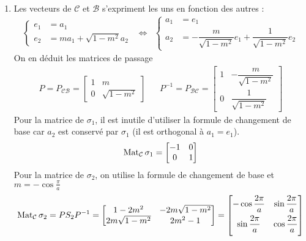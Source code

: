 \begin{enumerate}
\begin{enumerate}
\item Les vecteurs de $\mathcal C$ et $\mathcal B$ s'expriment les uns en fonction des autres :
\begin{align*}
 \left\lbrace 
\begin{aligned}
  e_1 &= a_1\\
 e_2 &= ma_1 +\sqrt{1-m^2}a_2 
\end{aligned}
\right. 
&\Leftrightarrow &
 \left\lbrace 
\begin{aligned}
 a_1 &= e_1 \\
 a_2 &= -\dfrac{m}{\sqrt{1-m^2}}e_1 +\dfrac{1}{\sqrt{1-m^2}}e_2 
\end{aligned}
\right. 
\end{align*}
On en déduit les matrices de passage
\begin{align*}
 P=P_{\mathcal C \mathcal B}=
\begin{bmatrix}
 1 & m \\
0 & \sqrt{1-m^2}
\end{bmatrix}
& &
P^{-1}=P_{\mathcal B \mathcal C}=
\begin{bmatrix}
 1 & -\dfrac{m}{\sqrt{1-m^2}} \\
0 & \dfrac{1}{\sqrt{1-m^2}}
\end{bmatrix}
\end{align*}
Pour la matrice de $\sigma_1$, il est inutile d'utiliser la formule de changement de base car $a_2$ est conservé par $\sigma_1$ (il est orthogonal à $a_1=e_1$).
\begin{displaymath}
 \operatorname{Mat}_{\mathcal C}\sigma_1 =
\begin{bmatrix}
 -1 & 0 \\
0 & 1
\end{bmatrix}
\end{displaymath}
Pour la matrice de $\sigma_2$, on utilise la formule de changement de base et $m=-\cos \frac{\pi}{a}$
\begin{displaymath}
\Mat_{\mathcal C}\sigma_2 =PS_2P^{-1}
=
\begin{bmatrix}
 1-2m^2 & -2m\sqrt{1-m^2} \\
2m\sqrt{1-m^2} & 2m^2-1
\end{bmatrix}
=
\begin{bmatrix}
 -\cos\dfrac{2\pi}{a} & \sin \dfrac{2\pi}{a} \vspace{4pt}\\
\sin \dfrac{2\pi}{a} & \cos \dfrac{2\pi}{a} \vspace{4pt}
\end{bmatrix}
\end{displaymath}

\end{enumerate}
\end{enumerate}
